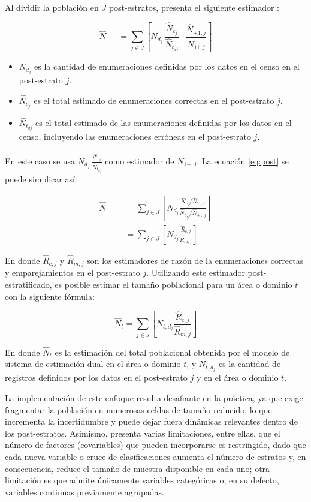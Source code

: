 \documentclass[
  12pt,
]{book}
\providecommand{\tightlist}{%
  \setlength{\itemsep}{0pt}\setlength{\parskip}{0pt}}
\begin{document}
Al dividir la población en \(J\) post-estratos, \citet{zamora2022pesdesign} presenta el siguiente estimador :

\begin{equation}
\hat{N}_{++} = \sum_{j \in J} \left[ N_{d_j} \, \frac{\hat{N}_{c_j}}{\hat{N}_{t_{dj}}} \, \cdot \frac{\hat{N}_{+1,j}}{\hat{N}_{11,j}} \right]
\label{eq:post}
\end{equation}

\begin{itemize}
\tightlist
\item
  \(N_{d_j}\) es la cantidad de enumeraciones definidas por los datos en el censo en el post-estrato \(j\).
\item
  \(\hat{N}_{c_j}\) es el total estimado de enumeraciones correctas en el post-estrato \(j\).
\item
  \(\hat{N}_{t_{dj}}\) es el total estimado de las enumeraciones definidas por los datos en el censo, incluyendo las enumeraciones erróneas en el post-estrato \(j\).
\end{itemize}

En este caso se usa \(N_{d_j} \, \frac{\hat{N}_{c_j}}{\hat{N}_{t_{dj}}}\) como estimador de \(N_{1+, j}\). La ecuación \eqref{eq:post} se puede simplicar así:

\begin{align*}
\hat{N}_{++} &= \sum_{j \in J} \left[ N_{d_j} \frac{\hat{N}_{c_j}/\hat{N}_{11,j}}{\hat{N}_{t_{dj}}/\hat{N}_{+1,j}}  \right] \\
             &= \sum_{j \in J} \left[ N_{d_j} \frac{\hat{R}_{c,j}}{\hat{R}_{m,j}}  \right]
\end{align*}

En donde \(\hat{R}_{c,j}\) y \(\hat{R}_{m,j}\) son los estimadores de razón de la enumeraciones correctas y emparejamientos en el post-estrato \(j\). Utilizando este estimador post-estratificado, es posible estimar el tamaño poblacional para un área o dominio \(t\) con la siguiente fórmula:

\[\hat{N}_t = \sum_{j \in J} \left[ N_{t, d_j} \frac{\hat{R}_{c,j}}{\hat{R}_{m,j}} \right]\]

En donde \(\hat{N}_t\) es la estimación del total poblacional obtenida por el modelo de sistema de estimación dual en el área o dominio \(t\), y \(N_{t, d_j}\) es la cantidad de registros definidos por los datos en el post-estrato \(j\) y en el área o dominio \(t\).

La implementación de este enfoque resulta desafiante en la práctica, ya que exige fragmentar la población en numerosas celdas de tamaño reducido, lo que incrementa la incertidumbre y puede dejar fuera dinámicas relevantes dentro de los post-estratos. Asimismo, presenta varias limitaciones, entre ellas, que el número de factores (covariables) que pueden incorporarse es restringido, dado que cada nueva variable o cruce de clasificaciones aumenta el número de estratos y, en consecuencia, reduce el tamaño de muestra disponible en cada uno; otra limitación es que admite únicamente variables categóricas o, en su defecto, variables continuas previamente agrupadas.
\end{document}
